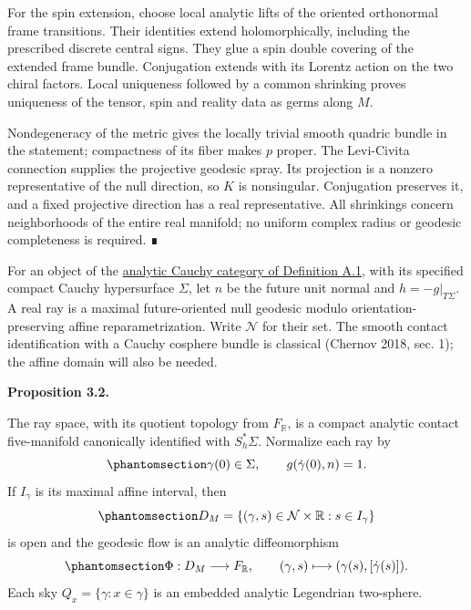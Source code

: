 \documentclass[
  english,
  11pt,
  reqno]{amsart}
\makeatletter
\newcommand{\pandocstatementheading}[1]{%
  \par\addpenalty{\@beginparpenalty}%
  \addvspace{.5\baselineskip plus .2\baselineskip minus .2\baselineskip}%
  {\normalfont\bfseries #1\par}%
  \nobreak\@afterindenttrue\@afterheading
}
\makeatother
\begin{document}
For the spin extension, choose local analytic lifts of the oriented
orthonormal frame transitions. Their identities extend holomorphically,
including the prescribed discrete central signs. They glue a spin double
covering of the extended frame bundle. Conjugation extends with its
Lorentz action on the two chiral factors. Local uniqueness followed by a
common shrinking proves uniqueness of the tensor, spin and reality data
as germs along \(M\).

Nondegeneracy of the metric gives the locally trivial smooth quadric
bundle in the statement; compactness of its fiber makes \(p\) proper.
The Levi-Civita connection supplies the projective geodesic spray. Its
projection is a nonzero representative of the null direction, so \(K\)
is nonsingular. Conjugation preserves it, and a fixed projective
direction has a real representative. All shrinkings concern
neighborhoods of the entire real manifold; no uniform complex radius or
geodesic completeness is required. ∎

For an object of the \hyperref[def:analytic-ghd-v2]{analytic Cauchy
category of Definition A.1}, with its specified compact Cauchy
hypersurface \(\Sigma\), let \(n\) be the future unit normal and
\(h=-g|_{T\Sigma}\). A real ray is a maximal future-oriented null
geodesic modulo orientation-preserving affine reparametrization. Write
\(\mathcal N\) for their set. The smooth contact identification with a
Cauchy cosphere bundle is classical (Chernov 2018, sec. 1); the affine
domain will also be needed.

\pandocstatementheading{\protect{}\label{prop:real-ray-cauchy-coordinates}Proposition 3.2.}

The ray space, with its quotient topology from \(F_{\mathbb R}\), is a
compact analytic contact five-manifold canonically identified with
\(S_h^*\Sigma\). Normalize each ray by
\begin{equation}\protect\phantomsection\label{eq:real-ray-affine-normalization}{
\gamma(0)\in\Sigma,
\qquad g(\dot\gamma(0),n)=1.
}\end{equation} If \(I_\gamma\) is its maximal affine interval, then
\begin{equation}\protect\phantomsection\label{eq:real-ray-affine-domain}{
D_M=\{(\gamma,s)\in\mathcal N\times\mathbb R:s\in I_\gamma\}
}\end{equation} is open and the geodesic flow is an analytic
diffeomorphism
\begin{equation}\protect\phantomsection\label{eq:real-ray-flow-identification}{
\Phi:D_M\longrightarrow F_{\mathbb R},
\qquad (\gamma,s)\longmapsto(\gamma(s),[\dot\gamma(s)]).
}\end{equation} Each sky \(Q_x=\{\gamma:x\in\gamma\}\) is an embedded
analytic Legendrian two-sphere.
\end{document}
